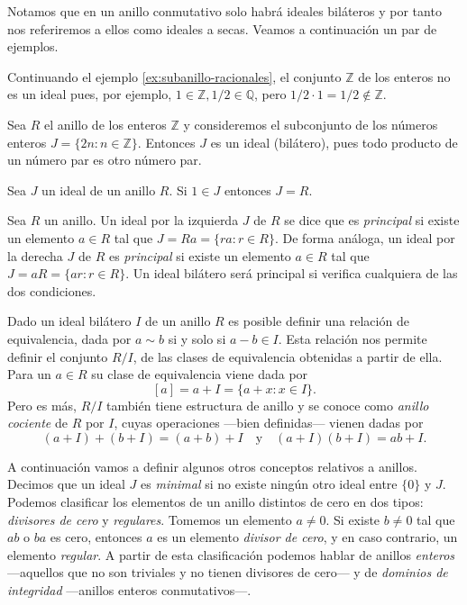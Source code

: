 Notamos que en un anillo conmutativo solo habrá ideales biláteros y por tanto nos referiremos a ellos como ideales a secas.
Veamos a continuación un par de ejemplos.

\begin{example}
  Continuando el ejemplo \ref{ex:subanillo-racionales}, el conjunto \(\mathbb Z\) de los enteros no es un ideal pues, por ejemplo, \(1 \in \mathbb Z, 1/2 \in \mathbb Q\), pero \(1/2 \cdot 1 = 1/2 \notin \mathbb Z\).
\end{example}

\begin{example}
  Sea \(R\) el anillo de los enteros \(\mathbb Z\) y consideremos el subconjunto de los números enteros \(J = \{2n : n \in \mathbb Z\}\).
  Entonces \(J\) es un ideal (bilátero), pues todo producto de un número par es otro número par.
\end{example}

\begin{proposition}
  \label{prop:ideal-unidad}
  Sea \(J\) un ideal de un anillo \(R\). Si \(1 \in J\) entonces \(J = R\).
\end{proposition}

\begin{definition}
  Sea \(R\) un anillo. Un ideal por la izquierda \(J\) de \(R\) se dice que es \textit{principal} si existe un elemento \(a \in R\) tal que \(J = Ra = \{ra : r \in R\}\).
  De forma análoga, un ideal por la derecha \(J\) de \(R\) es \textit{principal} si existe un elemento \(a \in R\) tal que \(J = aR = \{ar : r \in R\}\).
  Un ideal bilátero será principal si verifica cualquiera de las dos condiciones.
\end{definition}


Dado un ideal bilátero \(I\) de un anillo \(R\) es posible definir una relación de equivalencia, dada por \(a \sim b\) si y solo si \(a - b \in I\).
Esta relación nos permite definir el conjunto \(R/I\), de las clases de equivalencia obtenidas a partir de ella.
Para un \(a \in R\) su clase de equivalencia viene dada por
\[
  [a] = a + I = \{a + x : x \in I\}.  
\]
Pero es más, \(R/I\) también tiene estructura de anillo y se conoce como \emph{anillo cociente} de \(R\) por \(I\), cuyas operaciones —bien definidas— vienen dadas por
\[
  (a + I) + (b + I) = (a + b) + I \quad\text{y}\quad (a + I)(b + I) = ab + I.
\]

A continuación vamos a definir algunos otros conceptos relativos a anillos.
Decimos que un ideal \(J\) es \textit{minimal} si no existe ningún otro ideal entre \(\{0\}\) y \(J\).
Podemos clasificar los elementos de un anillo distintos de cero en dos tipos: \textit{divisores de cero} y \textit{regulares}.
Tomemos un elemento \(a \neq 0\).
Si existe \(b \neq 0\) tal que \(ab\) o \(ba\) es cero, entonces \(a\) es un elemento \textit{divisor de cero}, y en caso contrario, un elemento \textit{regular}.
A partir de esta clasificación podemos hablar de anillos \textit{enteros} —aquellos que no son triviales y no tienen divisores de cero— y de \textit{dominios de integridad} —anillos enteros conmutativos—.

